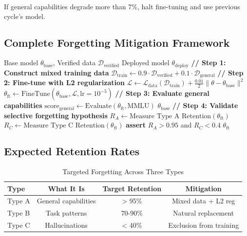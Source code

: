 \documentclass[12pt,a4paper]{article}
\theoremstyle{definition}
\begin{document}
If general capabilities degrade more than 7\%, halt fine-tuning and use previous cycle's model.

\subsection{Complete Forgetting Mitigation Framework}

\begin{algorithm}[htbp]
\caption{Catastrophic Forgetting Mitigation Protocol}
\begin{algorithmic}[1]
\Require Base model $\theta_{\text{base}}$, Verified data $\mathcal{D}_{\text{verified}}$
\Ensure Deployed model $\theta_{\text{deploy}}$
\State
\State \textbf{// Step 1: Construct mixed training data}
\State $\mathcal{D}_{\text{train}} \gets 0.9 \cdot \mathcal{D}_{\text{verified}} + 0.1 \cdot \mathcal{D}_{\text{general}}$
\State
\State \textbf{// Step 2: Fine-tune with L2 regularization}
\State $\mathcal{L} \gets \mathcal{L}_{\text{data}}(\mathcal{D}_{\text{train}}) + \frac{0.01}{2}\|\theta - \theta_{\text{base}}\|^2$
\State $\theta_{\text{ft}} \gets \text{FineTune}(\theta_{\text{base}}, \mathcal{L}, \text{lr}=10^{-5})$
\State
\State \textbf{// Step 3: Evaluate general capabilities}
\State $\text{score}_{\text{general}} \gets \text{Evaluate}(\theta_{\text{ft}}, \text{MMLU})$
    \State \Return $\theta_{\text{base}}$ 
\EndIf
\State
\State \textbf{// Step 4: Validate selective forgetting hypothesis}
\State $R_A \gets \text{Measure Type A Retention}(\theta_{\text{ft}})$ 
\State $R_C \gets \text{Measure Type C Retention}(\theta_{\text{ft}})$ 
\State \textbf{assert} $R_A > 0.95$ and $R_C < 0.4$ 
\State
\State \Return $\theta_{\text{ft}}$
\end{algorithmic}
\end{algorithm}

\subsection{Expected Retention Rates}

\begin{table}[htbp]
\centering
\caption{Targeted Forgetting Across Three Types}
\begin{tabular}{lccc}
\toprule
\textbf{Type} & \textbf{What It Is} & \textbf{Target Retention} & \textbf{Mitigation} \\
\midrule
Type A & General capabilities & > 95\% & Mixed data + L2 reg \\
Type B & Task patterns & 70-90\% & Natural replacement \\
Type C & Hallucinations & < 40\% & Exclusion from training \\
\bottomrule
\end{tabular}
\end{table}
\end{document}
